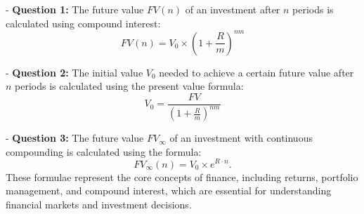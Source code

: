 \documentclass{article}
\begin{document}
- \textbf{Question 1:} The future value \( FV(n) \) of an investment after \( n \) periods is calculated using compound interest:
  \[ FV(n) = V_0 \times \left(1 + \frac{R}{m}\right)^{nm} \]

- \textbf{Question 2:} The initial value \( V_0 \) needed to achieve a certain future value after \( n \) periods is calculated using the present value formula:
  \[ V_0 = \frac{{FV}}{{\left(1 + \frac{R}{m}\right)^{nm}}} \]

- \textbf{Question 3:} The future value \( FV_{\infty} \) of an investment with continuous compounding is calculated using the formula:
  \[ FV_{\infty}(n) = V_0 \times e^{R \cdot n} . \] 
These formulae represent the core concepts of finance, including returns, portfolio management, and compound interest, which are essential for understanding financial markets and investment decisions.
\end{document}
